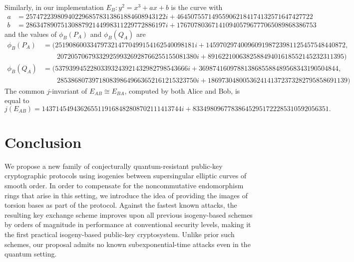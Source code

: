 \documentclass[jmc]{degruyter-journal-a}
\theoremstyle{definition}
\newcommand{\iso}{\cong}
\begin{document}
Similarly, in our implementation $E_B : y^2 = x^3 + ax
+ b$ is the curve with
{\tiny
\begin{align*}
a &= 2574722398094022968578313861884608943122 i + 464507557149559062184174132571647427722 \\
b &= 2863478907513088792144998311229772886197 i + 1767078036714109405796777065089868386753
\end{align*}
}
and the values of $\phi_B(P_A)$ and $\phi_B(Q_A)$ are
{\tiny
\begin{align*}
\phi_B(P_A) &=
(2519086003347973214770499154162540098181 i + 
    1459702974009609198723981125457548440872, \\
    & \qquad 2072057067933292599326928766255155081380 i + 
    891622100638258849401618552145232311395)
\\
\phi_B(Q_A) &=
(53793994522803393243921432982798543666 i + 
    3698741609788138685588489568343190504844, \\
    & \qquad 2853868073971808398649663652161215323750 i + 
    1869730480053624141372373282795858691139)
\end{align*}
}The common $j$-invariant of $E_{AB} \iso E_{BA}$, computed by both
Alice and Bob, is equal to
{\tiny
\[
j(E_{AB}) = 1437145494362655119168482808702111413744 i +
833498096778386452951722285310592056351.\]
}
\vspace{-2em}

\section{Conclusion}

We propose a new family of conjecturally quantum-resistant public-key
cryptographic protocols using isogenies between supersingular elliptic
curves of smooth order. In order to compensate for the noncommutative
endomorphism rings that arise in this setting, we introduce the idea
of providing the images of torsion bases as part of the
protocol. Against the fastest known attacks, the resulting key
exchange scheme improves upon all previous isogeny-based schemes by
orders of magnitude in performance at conventional security levels,
making it the first practical isogeny-based public-key cryptosystem.
Unlike prior such schemes, our proposal admits no known
subexponential-time attacks even in the quantum setting.




\end{document}

